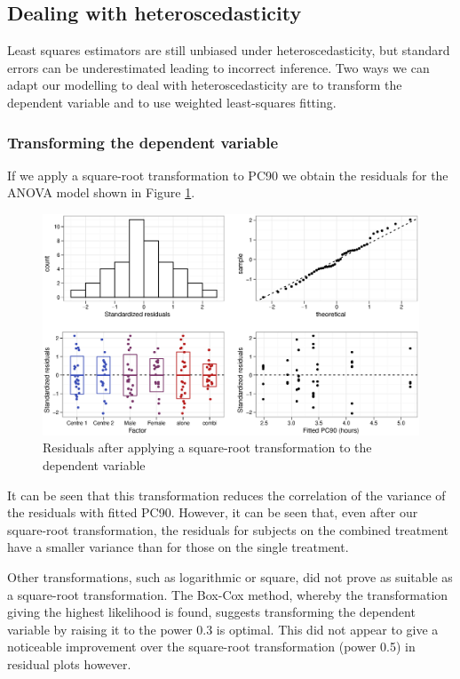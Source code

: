 \subsection{Dealing with heteroscedasticity}
Least squares estimators are still unbiased under heteroscedasticity\cite{long}, but standard errors can be underestimated leading to incorrect inference. Two ways we can adapt our modelling to deal with heteroscedasticity are to transform the dependent variable and to use weighted least-squares fitting.

\subsubsection*{Transforming the dependent variable}
If we apply a square-root transformation to PC90 we obtain the residuals for the ANOVA model shown in Figure \ref{aovsqrtres}.
\begin{figure}[h]
\includegraphics[width=6.5in]{aovsqrtres.eps} 
\caption{Residuals after applying a square-root transformation to the dependent variable}
\label{aovsqrtres}
\end{figure}
It can be seen that this transformation reduces the correlation of the variance of the residuals with fitted PC90. However, it can be seen that, even after our square-root transformation, the residuals for subjects on the combined treatment have a smaller variance than for those on the single treatment.%

Other transformations, such as logarithmic or square, did not prove as suitable as a square-root transformation. The Box-Cox method, whereby the transformation giving the highest likelihood is found, suggests transforming the dependent variable by raising it to the power 0.3 is optimal. This did not appear to give a noticeable improvement over the square-root transformation (power 0.5) in residual plots however. 

